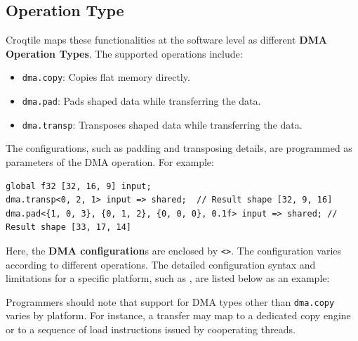\subsection*{Operation Type}

Croqtile maps these functionalities at the software level as different \textbf{DMA Operation Types}. The supported operations include:

\begin{itemize}[leftmargin=1.6em]
\item \texttt{dma.copy}: Copies flat memory directly.
\item \texttt{dma.pad}: Pads shaped data while transferring the data.
\item \texttt{dma.transp}: Transposes shaped data while transferring the data.
\end{itemize}

The configurations, such as padding and transposing details, are programmed as parameters of the DMA operation. For example:

\begin{lstlisting}[language=croqtile,caption={Operation Type}]
global f32 [32, 16, 9] input;
dma.transp<0, 2, 1> input => shared;  // Result shape [32, 9, 16]
dma.pad<{1, 0, 3}, {0, 1, 2}, {0, 0, 0}, 0.1f> input => shared; // Result shape [33, 17, 14]
\end{lstlisting}

Here, the \textbf{DMA configuration}s are enclosed by \texttt{\textless{}\textgreater{}}. The configuration varies according to different operations. The detailed configuration syntax and limitations for a specific platform, such as , are listed below as an example:

Programmers should note that support for DMA types other than \texttt{dma.copy} varies by platform. For instance, a transfer may map to a dedicated copy engine or to a sequence of load instructions issued by cooperating threads.
